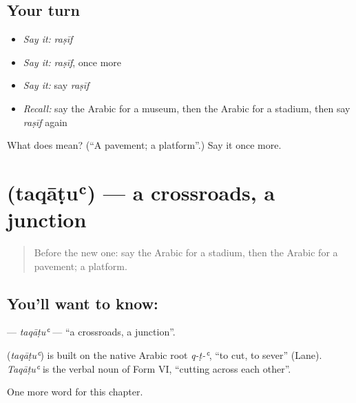 \subsection*{Your turn}
\begin{itemize}
\raggedright
  \item \emph{Say it:} \emph{raṣīf}
  \item \emph{Say it:} \emph{raṣīf}, once more
  \item \emph{Say it:} say \emph{raṣīf}
  \item \emph{Recall:} say the Arabic for a museum, then the Arabic for a stadium, then say \emph{raṣīf} again
\end{itemize}

\begin{tcolorbox}[breakable,colback=teal!4,colframe=teal!35!black,title={Before you move on}]
What does  mean? (\textquotedblleft{}A pavement; a platform\textquotedblright{}.) Say it once more.
\end{tcolorbox}
\section[\texorpdfstring{\ar{تقاطع} (taqāṭuʿ)}{تقاطع (taqāṭuʿ)}]{ (taqāṭuʿ) — a crossroads, a junction}

\label{lesson:AR-C235-taqatu}



\begin{quote}
Before the new one: say the Arabic for a stadium, then the Arabic for a pavement; a platform.
\end{quote}

\subsection*{You'll want to know: }
\textbf{} — \emph{taqāṭuʿ} — \textquotedblleft{}a crossroads, a junction\textquotedblright{}.

\begin{cousinweb}
\textbf{} (\emph{taqāṭuʿ}) is built on the native Arabic root \emph{q-ṭ-ʿ}, \textquotedblleft{}to cut, to sever\textquotedblright{} (Lane). \emph{Taqāṭuʿ} is the verbal noun of Form VI, \textquotedblleft{}cutting across each other\textquotedblright{}.
\end{cousinweb}

\begin{grammarlens}[title={What you've built}]
One more word for this chapter.
\end{grammarlens}

